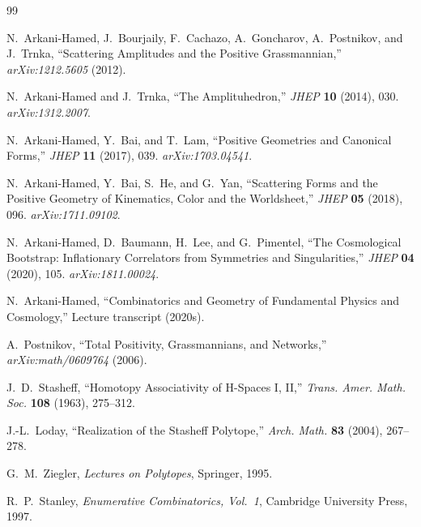 \documentclass[12pt, oneside]{amsart}
\theoremstyle{plain}
\theoremstyle{definition}
\theoremstyle{remark}
\begin{document}
\begin{thebibliography}{99}


N.~Arkani-Hamed, J.~Bourjaily, F.~Cachazo, A.~Goncharov, A.~Postnikov, and J.~Trnka,
\newblock ``Scattering Amplitudes and the Positive Grassmannian,''
\newblock \textit{arXiv:1212.5605} (2012).

N.~Arkani-Hamed and J.~Trnka,
\newblock ``The Amplituhedron,''
\newblock \textit{JHEP} \textbf{10} (2014), 030.
\newblock \textit{arXiv:1312.2007}.

N.~Arkani-Hamed, Y.~Bai, and T.~Lam,
\newblock ``Positive Geometries and Canonical Forms,''
\newblock \textit{JHEP} \textbf{11} (2017), 039.
\newblock \textit{arXiv:1703.04541}.

N.~Arkani-Hamed, Y.~Bai, S.~He, and G.~Yan,
\newblock ``Scattering Forms and the Positive Geometry of Kinematics, Color and the Worldsheet,''
\newblock \textit{JHEP} \textbf{05} (2018), 096.
\newblock \textit{arXiv:1711.09102}.

N.~Arkani-Hamed, D.~Baumann, H.~Lee, and G.~Pimentel,
\newblock ``The Cosmological Bootstrap: Inflationary Correlators from Symmetries and Singularities,''
\newblock \textit{JHEP} \textbf{04} (2020), 105.
\newblock \textit{arXiv:1811.00024}.

N.~Arkani-Hamed,
\newblock ``Combinatorics and Geometry of Fundamental Physics and Cosmology,''
\newblock Lecture transcript (2020s).


A.~Postnikov,
\newblock ``Total Positivity, Grassmannians, and Networks,''
\newblock \textit{arXiv:math/0609764} (2006).

J.~D.~Stasheff,
\newblock ``Homotopy Associativity of H-Spaces I, II,''
\newblock \textit{Trans. Amer. Math. Soc.} \textbf{108} (1963), 275--312.

J.-L.~Loday,
\newblock ``Realization of the Stasheff Polytope,''
\newblock \textit{Arch. Math.} \textbf{83} (2004), 267--278.

G.~M.~Ziegler,
\newblock \textit{Lectures on Polytopes},
\newblock Springer, 1995.

R.~P.~Stanley,
\newblock \textit{Enumerative Combinatorics, Vol.\ 1},
\newblock Cambridge University Press, 1997.


\end{thebibliography}
\end{document}
